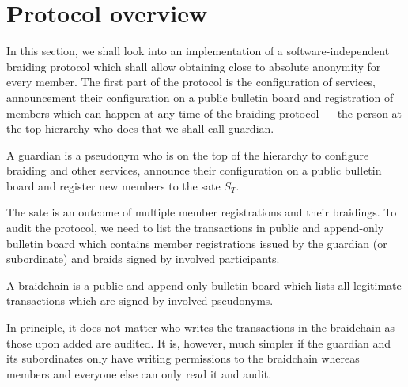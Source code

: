 \documentclass[12pt]{article}
\newenvironment{definition}[2][Definition]{\begin{trivlist}
\item[\hskip \labelsep {\bfseries #1}\hskip \labelsep {\bfseries #2.}]}{\end{trivlist}}
\begin{document}
\section*{Protocol overview}

In this section, we shall look into an implementation of a software-independent braiding protocol which shall allow obtaining close to absolute anonymity for every member. The first part of the protocol is the configuration of services, announcement their configuration on a public bulletin board and registration of members which can happen at any time of the braiding protocol — the person at the top hierarchy who does that we shall call guardian.

\begin{definition}{(guardian)}
  A guardian is a pseudonym who is on the top of the hierarchy to configure braiding and other services, announce their configuration on a public bulletin board and register new members to the sate $S_T$.
\end{definition}

The sate is an outcome of multiple member registrations and their braidings. To audit the protocol, we need to list the transactions in public and append-only bulletin board which contains member registrations issued by the guardian (or subordinate) and braids signed by involved participants.

\begin{definition}{(braidchain)}
  A braidchain is a public and append-only bulletin board which lists all legitimate transactions which are signed by involved pseudonyms. 
\end{definition}

In principle, it does not matter who writes the transactions in the braidchain as those upon added are audited. It is, however, much simpler if the guardian and its subordinates only have writing permissions to the braidchain whereas members and everyone else can only read it and audit.
\end{document}
